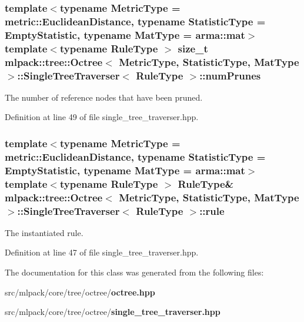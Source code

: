 \subsubsection[{num\+Prunes}]{\setlength{\rightskip}{0pt plus 5cm}template$<$typename Metric\+Type  = metric\+::\+Euclidean\+Distance, typename Statistic\+Type  = Empty\+Statistic, typename Mat\+Type  = arma\+::mat$>$ template$<$typename Rule\+Type $>$ size\+\_\+t {\bf mlpack\+::tree\+::\+Octree}$<$ Metric\+Type, Statistic\+Type, Mat\+Type $>$\+::{\bf Single\+Tree\+Traverser}$<$ Rule\+Type $>$\+::num\+Prunes\hspace{0.3cm}{\ttfamily [private]}}\label{classmlpack_1_1tree_1_1Octree_1_1SingleTreeTraverser_aeed81fa993e4c7b9619d1c9ca926b4a5}


The number of reference nodes that have been pruned. 



Definition at line 49 of file single\+\_\+tree\+\_\+traverser.\+hpp.

\subsubsection[{rule}]{\setlength{\rightskip}{0pt plus 5cm}template$<$typename Metric\+Type  = metric\+::\+Euclidean\+Distance, typename Statistic\+Type  = Empty\+Statistic, typename Mat\+Type  = arma\+::mat$>$ template$<$typename Rule\+Type $>$ Rule\+Type\& {\bf mlpack\+::tree\+::\+Octree}$<$ Metric\+Type, Statistic\+Type, Mat\+Type $>$\+::{\bf Single\+Tree\+Traverser}$<$ Rule\+Type $>$\+::rule\hspace{0.3cm}{\ttfamily [private]}}\label{classmlpack_1_1tree_1_1Octree_1_1SingleTreeTraverser_a06f5bbbdc88e51b940c3288c5f3d2241}


The instantiated rule. 



Definition at line 47 of file single\+\_\+tree\+\_\+traverser.\+hpp.



The documentation for this class was generated from the following files\+:\begin{DoxyCompactItemize}
\item 
src/mlpack/core/tree/octree/{\bf octree.\+hpp}\item 
src/mlpack/core/tree/octree/{\bf single\+\_\+tree\+\_\+traverser.\+hpp}\end{DoxyCompactItemize}
